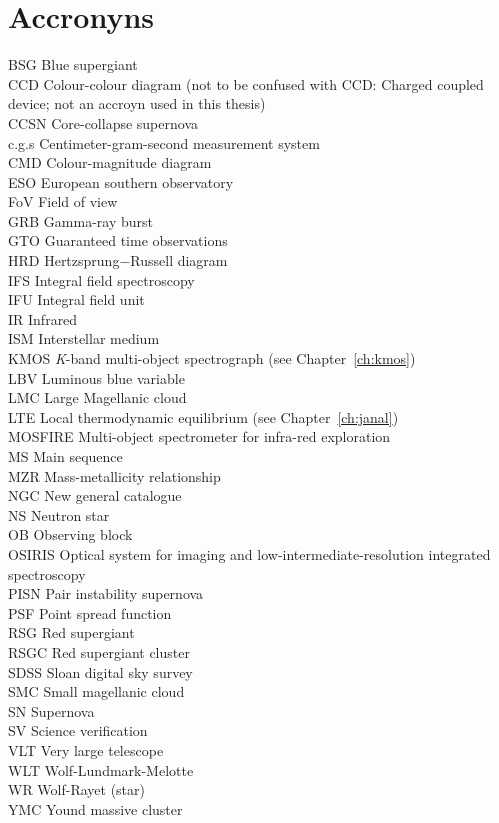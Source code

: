 \chapter{Accronyns}\label{ch:acc}

BSG Blue supergiant\\
CCD Colour-colour diagram (not to be confused with CCD: Charged coupled device; not an accroyn used in this thesis)\\
CCSN Core-collapse supernova\\
c.g.s Centimeter-gram-second measurement system\\
CMD Colour-magnitude diagram\\
ESO European southern observatory\\
FoV Field of view\\
GRB Gamma-ray burst\\
GTO Guaranteed time observations\\
HRD Hertzsprung$-$Russell diagram\\
IFS Integral field spectroscopy\\
IFU Integral field unit\\
IR Infrared\\
ISM Interstellar medium\\
KMOS {\it K}-band multi-object spectrograph (see Chapter~\ref{ch:kmos})\\
LBV Luminous blue variable\\
LMC Large Magellanic cloud\\
LTE Local thermodynamic equilibrium (see Chapter~\ref{ch:janal})\\
MOSFIRE Multi-object spectrometer for infra-red exploration\\
MS Main sequence\\
MZR Mass-metallicity relationship\\
NGC New general catalogue\\
NS Neutron star\\
OB Observing block\\
OSIRIS Optical system for imaging and low-intermediate-resolution integrated spectroscopy\\
PISN Pair instability supernova\\
PSF Point spread function\\
RSG Red supergiant\\
RSGC Red supergiant cluster\\
SDSS Sloan digital sky survey\\
SMC Small magellanic cloud\\
SN Supernova\\
SV Science verification\\
VLT Very large telescope\\
WLT Wolf-Lundmark-Melotte\\
WR Wolf-Rayet (star)\\
YMC Yound massive cluster\\

